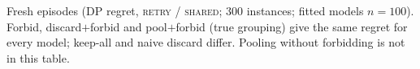 \begin{table}[!htbp]
\centering\scriptsize\setlength{\tabcolsep}{3pt}
\caption{Fresh episodes (DP regret, \textsc{retry} / \textsc{shared}; 300 instances; fitted models $n{=}100$). Forbid, discard${+}$forbid and pool${+}$forbid (true grouping) give the same regret for every model; keep-all and naive discard differ. Pooling without forbidding is not in this table.}
\label{tab:app-d2f}
\resizebox{\linewidth}{!}{}
\end{table}
